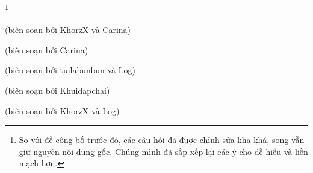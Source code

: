 \noindent

{} 
\footnote{So với đề công bố trước đó, các câu hỏi đã được chỉnh sửa kha khá, song vẫn giữ nguyên nội dung gốc. Chúng mình đã sắp xếp lại các ý cho dễ hiểu và liền mạch hơn.}
\setcounter{equation}{0}


\begin{center}
\end{center}

\begin{flushright}
    (biên soạn bởi KhorzX và Carina)
\end{flushright}
\newpage

{\vspace{1.5mm}}
\setcounter{equation}{0}


\begin{center}
\end{center}

\begin{flushright}
    (biên soạn bởi Carina)
\end{flushright}
\newpage

{}
\setcounter{equation}{0}


\begin{center}
\end{center}


\begin{flushright}
   (biên soạn bởi tuilabunbun và Log)
\end{flushright}
\newpage

{}
\setcounter{equation}{0}


\begin{center}
\end{center}

\begin{flushright}
    (biên soạn bởi Khuidapchai)
\end{flushright}
\newpage

{}
\setcounter{equation}{0}


\begin{center}
\end{center}

\begin{flushright}
    (biên soạn bởi KhorzX và Log)
\end{flushright}



